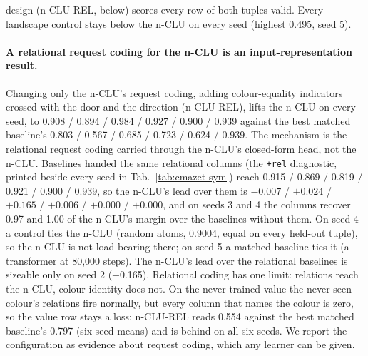 \documentclass{article} %
\begin{document}
design (n-CLU-REL, below) scores every row of both tuples valid. %
Every landscape
control stays below the n-CLU on every seed (highest 0.495, seed 5).

\paragraph{A relational request coding for the n-CLU is an input-representation result.} Changing only the
n-CLU's request coding, adding colour-equality indicators crossed with the door and the direction
(n-CLU-REL), lifts the n-CLU on every seed, to 0.908 / 0.894 / 0.984 / 0.927 / 0.900 / 0.939
against the best matched baseline's 0.803 / 0.567 / 0.685 / 0.723 / 0.624 / 0.939. The mechanism is the
relational request coding carried through the n-CLU's closed-form head, not the n-CLU. Baselines handed
the same relational columns (the \texttt{+rel} diagnostic, printed beside every seed in
Tab.~\ref{tab:cmazet-sym}) reach 0.915 / 0.869 / 0.819 / 0.921 / 0.900 / 0.939, so the n-CLU's lead
over them is $-0.007$ / $+0.024$ / $+0.165$ / $+0.006$ / $+0.000$ / $+0.000$, and on seeds 3 and 4 the
columns recover 0.97 and 1.00 of the n-CLU's margin over the baselines without them. On seed 4 a control
ties the n-CLU (random atoms, 0.9004, equal on every held-out tuple), so the n-CLU is not load-bearing
there; on seed 5 a matched baseline ties it (a transformer at 80,000 steps). The n-CLU's lead over the
relational baselines is sizeable only on seed 2 (+0.165). Relational coding has one limit: relations
reach the n-CLU, colour identity does not. On the never-trained value the never-seen colour's
relations fire normally, but every column that names the colour is zero, so the value row stays a
loss: n-CLU-REL reads 0.554 against the best matched baseline's 0.797 (six-seed means) and is %
behind on all six seeds. We report the configuration as evidence about
request coding, which any learner can be given.
\end{document}
